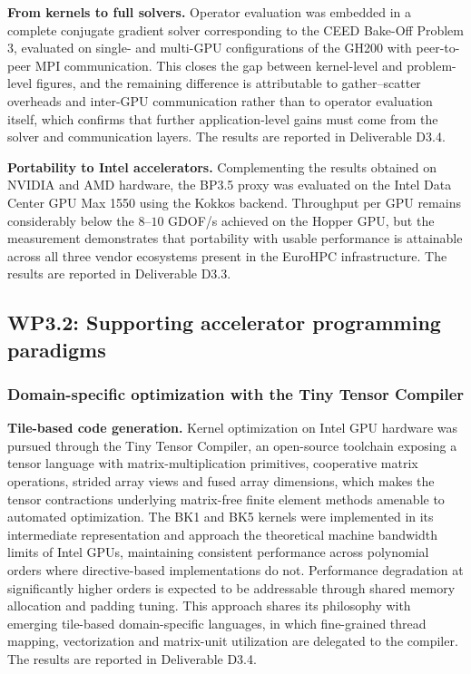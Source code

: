 \documentclass[a4paper,12pt, numbers]{article}
\begin{document}
\noindent\textbf{From kernels to full solvers.}
Operator evaluation was embedded in a complete conjugate gradient solver corresponding to the CEED Bake-Off Problem 3, evaluated on single- and multi-GPU configurations of the GH200 with peer-to-peer MPI communication. This closes the gap between kernel-level and problem-level figures, and the remaining difference is attributable to gather--scatter overheads and inter-GPU communication rather than to operator evaluation itself, which confirms that further application-level gains must come from the solver and communication layers. The results are reported in Deliverable D3.4.

\noindent\textbf{Portability to Intel accelerators.}
Complementing the results obtained on NVIDIA and AMD hardware, the BP3.5 proxy was evaluated on the Intel Data Center GPU Max 1550 using the Kokkos backend. Throughput per GPU remains considerably below the $8$--$10$ GDOF/s achieved on the Hopper GPU, but the measurement demonstrates that portability with usable performance is attainable across all three vendor ecosystems present in the EuroHPC infrastructure. The results are reported in Deliverable D3.3.

\subsection{WP3.2: Supporting accelerator programming paradigms}

\subsubsection*{Domain-specific optimization with the Tiny Tensor Compiler}

\noindent\textbf{Tile-based code generation.}
Kernel optimization on Intel GPU hardware was pursued through the Tiny Tensor Compiler, an open-source toolchain exposing a tensor language with matrix-multiplication primitives, cooperative matrix operations, strided array views and fused array dimensions, which makes the tensor contractions underlying matrix-free finite element methods amenable to automated optimization. The BK1 and BK5 kernels were implemented in its intermediate representation and approach the theoretical machine bandwidth limits of Intel GPUs, maintaining consistent performance across polynomial orders where directive-based implementations do not. Performance degradation at significantly higher orders is expected to be addressable through shared memory allocation and padding tuning. This approach shares its philosophy with emerging tile-based domain-specific languages, in which fine-grained thread mapping, vectorization and matrix-unit utilization are delegated to the compiler. The results are reported in Deliverable D3.4.
\end{document}
